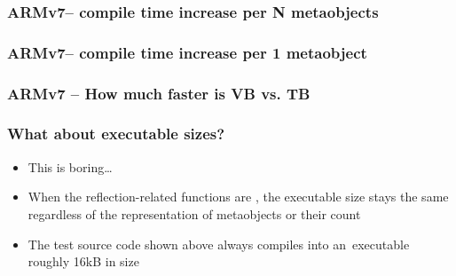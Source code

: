 \documentclass[compress,table,xcolor=table]{beamer}
\begin{document}
\begin{frame}
  \frametitle{ARMv7-- compile time increase per N metaobjects}
\end{frame}
\begin{frame}
  \frametitle{ARMv7-- compile time increase per 1 metaobject}
\end{frame}
\begin{frame}
  \frametitle{ARMv7 -- How much faster is VB vs. TB}
\end{frame}
\begin{frame}
  \frametitle{What about executable sizes?}
  \Large
  \begin{itemize}
    \item This is boring\ldots
    \item When the reflection-related functions are ,
      the executable size stays the same regardless of the representation
      of metaobjects or their count
    \item The test source code shown above always compiles into an~executable
      roughly 16kB  in size

  \end{itemize}
\end{frame}
\end{document}
